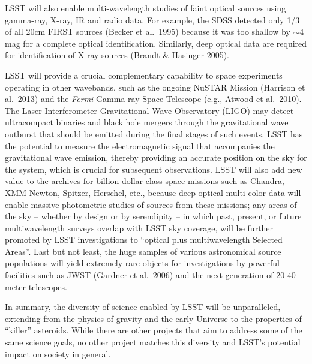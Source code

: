 LSST will also enable multi-wavelength studies of faint optical
sources using gamma-ray, X-ray, IR and radio data.  For example, the
SDSS detected only 1/3 of all 20cm FIRST sources (Becker et al.~1995)
because it was too shallow by $\sim$4 mag for a complete optical
identification. Similarly, deep optical data are required for
identification of X-ray sources (Brandt \& Hasinger 2005).

LSST will provide a crucial complementary capability to space
experiments operating in other wavebands, such as the ongoing
NuSTAR Mission (Harrison et al.~2013)
and the {\it Fermi}
Gamma-ray Space Telescope (e.g., Atwood et al.~2010).
The Laser Interferometer Gravitational
Wave Observatory (LIGO) may detect ultracompact binaries and black hole mergers through the
gravitational wave outburst that should be emitted during the final stages of such events.
LSST has the potential to measure the electromagnetic signal that accompanies the gravitational wave emission,
thereby providing an accurate position on the sky for the system, which is
crucial for subsequent observations. LSST will also add new value to the archives for
billion-dollar class space missions such as Chandra, XMM-Newton, Spitzer, Herschel,
etc., because deep optical multi-color data will enable
massive photometric  studies of sources from these missions;
any areas of the sky -- whether by design or by serendipity -- in which past, present, or future
multiwavelength surveys overlap with LSST sky coverage, will be further promoted by LSST
investigations to ``optical plus multiwavelength Selected Areas''.
Last but not least, the huge samples of various astronomical source
populations will yield extremely rare objects for investigations by powerful
facilities such as JWST (Gardner et al.~2006) and the next generation
of 20-40 meter telescopes.

In summary, the diversity of science enabled by LSST will be
unparalleled, extending from the physics of gravity and the
early Universe to the properties of ``killer'' asteroids. While
there are other projects that aim to address some of the same
science goals, no other project matches this diversity and
LSST's potential impact on society in general.
